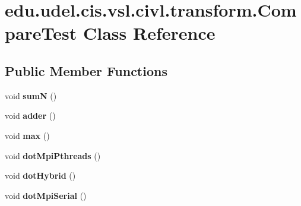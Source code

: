 \hypertarget{classedu_1_1udel_1_1cis_1_1vsl_1_1civl_1_1transform_1_1CompareTest}{}\section{edu.\+udel.\+cis.\+vsl.\+civl.\+transform.\+Compare\+Test Class Reference}
\label{classedu_1_1udel_1_1cis_1_1vsl_1_1civl_1_1transform_1_1CompareTest}
\subsection*{Public Member Functions}
\begin{DoxyCompactItemize}
\item 
\hypertarget{classedu_1_1udel_1_1cis_1_1vsl_1_1civl_1_1transform_1_1CompareTest_a36c9b80e09c953d40e1f9726d5d99186}{}void {\bfseries sum\+N} ()\label{classedu_1_1udel_1_1cis_1_1vsl_1_1civl_1_1transform_1_1CompareTest_a36c9b80e09c953d40e1f9726d5d99186}

\item 
\hypertarget{classedu_1_1udel_1_1cis_1_1vsl_1_1civl_1_1transform_1_1CompareTest_a03049ead53681023525bc1e11e61249f}{}void {\bfseries adder} ()\label{classedu_1_1udel_1_1cis_1_1vsl_1_1civl_1_1transform_1_1CompareTest_a03049ead53681023525bc1e11e61249f}

\item 
\hypertarget{classedu_1_1udel_1_1cis_1_1vsl_1_1civl_1_1transform_1_1CompareTest_acdcc022c84c1e7c7ef18ad247775f54a}{}void {\bfseries max} ()\label{classedu_1_1udel_1_1cis_1_1vsl_1_1civl_1_1transform_1_1CompareTest_acdcc022c84c1e7c7ef18ad247775f54a}

\item 
\hypertarget{classedu_1_1udel_1_1cis_1_1vsl_1_1civl_1_1transform_1_1CompareTest_a3b096cdf3e44189a0b05739913fd316e}{}void {\bfseries dot\+Mpi\+Pthreads} ()\label{classedu_1_1udel_1_1cis_1_1vsl_1_1civl_1_1transform_1_1CompareTest_a3b096cdf3e44189a0b05739913fd316e}

\item 
\hypertarget{classedu_1_1udel_1_1cis_1_1vsl_1_1civl_1_1transform_1_1CompareTest_aa780405f9f25caa04ddc3783f914e000}{}void {\bfseries dot\+Hybrid} ()\label{classedu_1_1udel_1_1cis_1_1vsl_1_1civl_1_1transform_1_1CompareTest_aa780405f9f25caa04ddc3783f914e000}

\item 
\hypertarget{classedu_1_1udel_1_1cis_1_1vsl_1_1civl_1_1transform_1_1CompareTest_aca423e6d4577a6ba20feae7dc351ae3e}{}void {\bfseries dot\+Mpi\+Serial} ()\label{classedu_1_1udel_1_1cis_1_1vsl_1_1civl_1_1transform_1_1CompareTest_aca423e6d4577a6ba20feae7dc351ae3e}


\end{DoxyCompactItemize}
